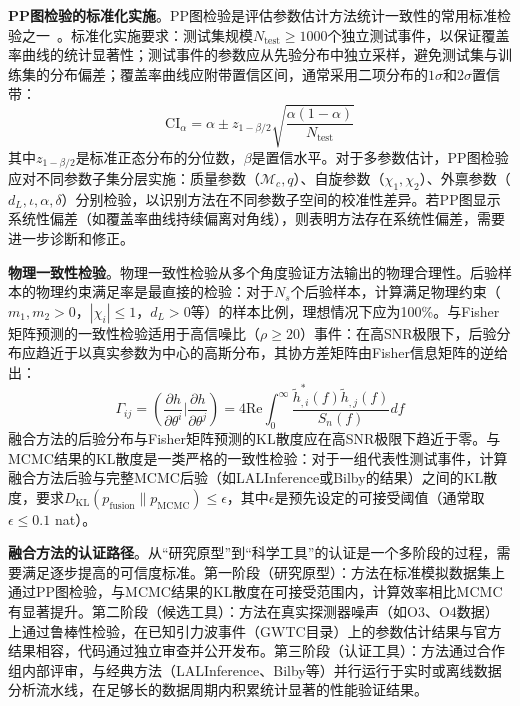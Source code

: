\textbf{PP图检验的标准化实施}。PP图检验是评估参数估计方法统计一致性的常用标准检验之一~\cite{cook2006validation}。标准化实施要求：测试集规模$N_{\text{test}} \geq 1000$个独立测试事件，以保证覆盖率曲线的统计显著性；测试事件的参数应从先验分布中独立采样，避免测试集与训练集的分布偏差；覆盖率曲线应附带置信区间，通常采用二项分布的$1\sigma$和$2\sigma$置信带：
\begin{equation}
\text{CI}_\alpha = \alpha \pm z_{1-\beta/2} \sqrt{\frac{\alpha(1-\alpha)}{N_{\text{test}}}}
\end{equation}
其中$z_{1-\beta/2}$是标准正态分布的分位数，$\beta$是置信水平。对于多参数估计，PP图检验应对不同参数子集分层实施：质量参数（$\mathcal{M}_c, q$）、自旋参数（$\chi_1, \chi_2$）、外禀参数（$d_L, \iota, \alpha, \delta$）分别检验，以识别方法在不同参数子空间的校准性差异。若PP图显示系统性偏差（如覆盖率曲线持续偏离对角线），则表明方法存在系统性偏差，需要进一步诊断和修正。

\textbf{物理一致性检验}。物理一致性检验从多个角度验证方法输出的物理合理性。后验样本的物理约束满足率是最直接的检验：对于$N_s$个后验样本，计算满足物理约束（$m_1, m_2 > 0$，$|\chi_i| \leq 1$，$d_L > 0$等）的样本比例，理想情况下应为100\%。与Fisher矩阵预测的一致性检验适用于高信噪比（$\rho \geq 20$）事件：在高SNR极限下，后验分布应趋近于以真实参数为中心的高斯分布，其协方差矩阵由Fisher信息矩阵的逆给出：
\begin{equation}
\Gamma_{ij} = \left( \frac{\partial h}{\partial \theta^i} \bigg| \frac{\partial h}{\partial \theta^j} \right) = 4 \text{Re} \int_0^\infty \frac{\tilde{h}^*_{,i}(f) \tilde{h}_{,j}(f)}{S_n(f)} df
\end{equation}
融合方法的后验分布与Fisher矩阵预测的KL散度应在高SNR极限下趋近于零。与MCMC结果的KL散度是一类严格的一致性检验：对于一组代表性测试事件，计算融合方法后验与完整MCMC后验（如LALInference或Bilby的结果）之间的KL散度，要求$D_{\text{KL}}(p_{\text{fusion}} \| p_{\text{MCMC}}) \leq \epsilon$，其中$\epsilon$是预先设定的可接受阈值（通常取$\epsilon \leq 0.1$ nat）。

\textbf{融合方法的认证路径}。从“研究原型”到“科学工具”的认证是一个多阶段的过程，需要满足逐步提高的可信度标准。第一阶段（研究原型）：方法在标准模拟数据集上通过PP图检验，与MCMC结果的KL散度在可接受范围内，计算效率相比MCMC有显著提升。第二阶段（候选工具）：方法在真实探测器噪声（如O3、O4数据）上通过鲁棒性检验，在已知引力波事件（GWTC目录）上的参数估计结果与官方结果相容，代码通过独立审查并公开发布。第三阶段（认证工具）：方法通过合作组内部评审，与经典方法（LALInference、Bilby等）并行运行于实时或离线数据分析流水线，在足够长的数据周期内积累统计显著的性能验证结果。


